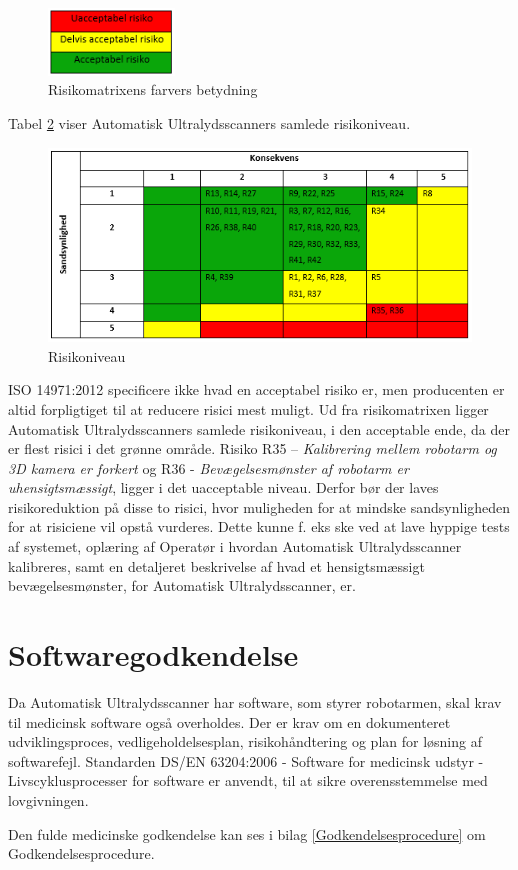 \begin{figure}[H]
    \centering
    \includegraphics[width=0.30\textwidth]{figurer/r/Niveau}
    \caption{Risikomatrixens farvers betydning}
    \label{Niveau}
\end{figure}

Tabel \ref{Risiko} viser Automatisk Ultralydsscanners samlede risikoniveau. 

\begin{figure}[H]
    \centering
    \includegraphics[width=1\textwidth]{figurer/r/Risiko}
    \caption{Risikoniveau}
    \label{Risiko}
\end{figure}

ISO 14971:2012 specificere ikke hvad en acceptabel risiko er, men producenten er altid forpligtiget til at reducere risici mest muligt. Ud fra risikomatrixen ligger Automatisk Ultralydsscanners samlede risikoniveau, i den acceptable ende, da der er flest risici i det grønne område. Risiko R35 – \textit{Kalibrering mellem robotarm og 3D kamera er forkert} og R36 - \textit{Bevægelsesmønster af robotarm er uhensigtsmæssigt}, ligger i det uacceptable niveau. Derfor bør der laves risikoreduktion på disse to risici, hvor muligheden for at mindske sandsynligheden for at risiciene vil opstå vurderes. Dette kunne f. eks ske ved at lave hyppige tests af systemet, oplæring af Operatør i hvordan Automatisk Ultralydsscanner kalibreres, samt en detaljeret beskrivelse af hvad et hensigtsmæssigt bevægelsesmønster, for Automatisk Ultralydsscanner, er. 

\section{Softwaregodkendelse}
Da Automatisk Ultralydsscanner har software, som styrer robotarmen, skal krav til medicinsk software også overholdes. Der er krav om en dokumenteret udviklingsproces, vedligeholdelsesplan, risikohåndtering og plan for løsning af softwarefejl. Standarden DS/EN 63204:2006 - Software for medicinsk udstyr - Livscyklusprocesser for software \cite{software} er anvendt, til at sikre overensstemmelse med lovgivningen.

Den fulde medicinske godkendelse kan ses i bilag \ref {Godkendelsesprocedure} om Godkendelsesprocedure.
